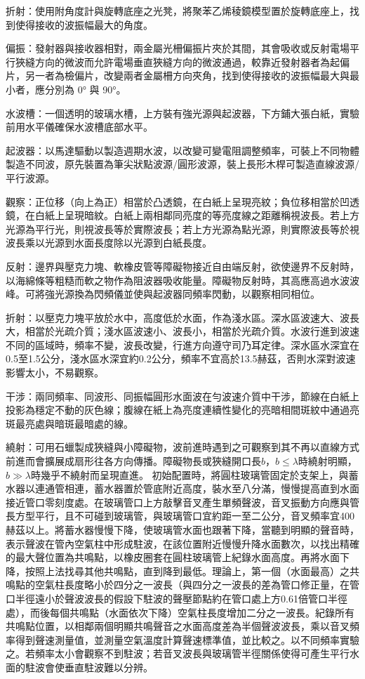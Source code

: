 \documentclass[a4paper,12pt]{report}
\begin{document}
\item 折射：使用附角度計與旋轉底座之光凳，將聚苯乙烯稜鏡模型置於旋轉底座上，找到使得接收的波振幅最大的角度。
\item 偏振：發射器與接收器相對，兩金屬光柵偏振片夾於其間，其會吸收或反射電場平行狹縫方向的微波而允許電場垂直狹縫方向的微波通過，較靠近發射器者為起偏片，另一者為檢偏片，改變兩者金屬柵方向夾角，找到使得接收的波振幅最大與最小者，應分別為 0° 與 90°。
\eit
{}
\bit
\item 水波槽：一個透明的玻璃水槽，上方裝有強光源與起波器，下方鋪大張白紙，實驗前用水平儀確保水波槽底部水平。
\item 起波器：以馬達驅動以製造週期水波，以改變可變電阻調整頻率，可裝上不同物體製造不同波，原先裝置為筆尖狀點波源/圓形波源，裝上長形木桿可製造直線波源/平行波源。
\item 觀察：正位移（向上為正）相當於凸透鏡，在白紙上呈現亮紋；負位移相當於凹透鏡，在白紙上呈現暗紋。白紙上兩相鄰同亮度的等亮度線之距離稱視波長。若上方光源為平行光，則視波長等於實際波長；若上方光源為點光源，則實際波長等於視波長乘以光源到水面長度除以光源到白紙長度。
\item 反射：邊界與壓克力塊、軟橡皮管等障礙物接近自由端反射，欲使邊界不反射時，以海綿條等粗糙而軟之物作為阻波器吸收能量。障礙物反射時，其高應高過水波波峰。可將強光源換為閃頻儀並使與起波器同頻率閃動，以觀察相同相位。
\item 折射：以壓克力塊平放於水中，高度低於水面，作為淺水區。深水區波速大、波長大，相當於光疏介質；淺水區波速小、波長小，相當於光疏介質。水波行進到波速不同的區域時，頻率不變，波長改變，行進方向遵守司乃耳定律。深水區水深宜在0.5至1.5公分，淺水區水深宜約0.2公分，頻率不宜高於13.5赫茲，否則水深對波速影響太小，不易觀察。
\item 干涉：兩同頻率、同波形、同振幅圓形水面波在勻波速介質中干涉，節線在白紙上投影為穩定不動的灰色線；腹線在紙上為亮度連續性變化的亮暗相間斑紋中通過亮斑最亮處與暗斑最暗處的線。
\item 繞射：可用石蠟製成狹縫與小障礙物，波前進時遇到之可觀察到其不再以直線方式前進而會擴展成扇形往各方向傳播。障礙物長或狹縫開口長$b$，$b\leq\lambda$時繞射明顯，$b\gg \lambda$時幾乎不繞射而呈現直進。
\eit
{}
初始配置時，將圓柱玻璃管固定於支架上，與蓄水器以連通管相連，蓄水器置於管底附近高度，裝水至八分滿，慢慢提高直到水面接近管口零刻度處。在玻璃管口上方敲擊音叉產生單頻聲波，音叉振動方向應與管長方型平行，且不可碰到玻璃管，與玻璃管口宜約距一至二公分，音叉頻率宜400赫茲以上。將蓄水器慢慢下降，使玻璃管水面也跟著下降，當聽到明顯的聲音時，表示聲波在管內空氣柱中形成駐波，在該位置附近慢慢升降水面數次，以找出精確的最大聲位置為共鳴點，以橡皮圈套在圓柱玻璃管上紀錄水面高度。再將水面下降，按照上法找尋其他共鳴點，直到降到最低。理論上，第一個（水面最高）之共鳴點的空氣柱長度略小於四分之一波長（與四分之一波長的差為管口修正量，在管口半徑遠小於聲波波長的假設下駐波的聲壓節點約在管口處上方0.61倍管口半徑處），而後每個共鳴點（水面依次下降）空氣柱長度增加二分之一波長。紀錄所有共鳴點位置，以相鄰兩個明顯共鳴聲音之水面高度差為半個聲波波長，乘以音叉頻率得到聲速測量值，並測量空氣溫度計算聲速標準值，並比較之。以不同頻率實驗之。若頻率太小會觀察不到駐波；若音叉波長與玻璃管半徑關係使得可產生平行水面的駐波會使垂直駐波難以分辨。
\end{document}

